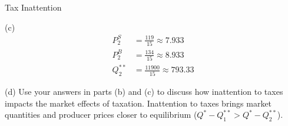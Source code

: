 \documentclass[8pt]{extarticle}
\begin{document}
\begin{problem}{Tax Inattention}
\begin{problem}{(c)}
\begin{align*}
        P^{S}_{2} &= \frac{119}{15} \approx 7.933\\
        P^{B}_{2} &= \frac{134}{15} \approx 8.933\\
        Q^{\ast\ast}_{2} &= \frac{11900}{15} \approx 793.33
      \end{align*}
    \end{problem}
    \begin{problem}{(d)}
      Use your answers in parts (b) and (c) to discuss how inattention to taxes impacts the market effects of taxation.
      \tcblower
      Inattention to taxes brings market quantities and producer prices closer to equilibrium ($Q^{\ast} - Q^{\ast\ast}_{1} > Q^{\ast} - Q^{\ast\ast}_{2}$).
    \end{problem}
  \end{problem}
\end{document}
